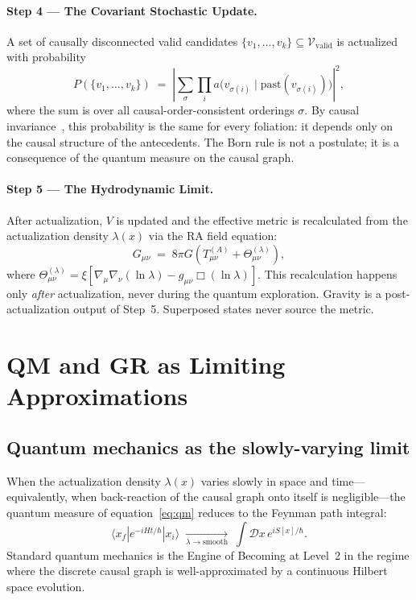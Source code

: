 \documentclass[11pt,twocolumn]{article}
\theoremstyle{plain}
\theoremstyle{remark}
\newcommand{\Vvalid}{\mathcal{V}_{\mathrm{valid}}}
\begin{document}
\paragraph{Step 4 --- The Covariant Stochastic Update.}
A set of causally disconnected valid candidates
$\{v_1,\ldots,v_k\} \subseteq \Vvalid$ is actualized with probability
\begin{equation}
  P(\{v_1,\ldots,v_k\})
  \;=\; \left|\sum_\sigma \prod_i a\bigl(v_{\sigma(i)}
    \mid \mathrm{past}(v_{\sigma(i)})\bigr)\right|^2,
  \label{eq:update}
\end{equation}
where the sum is over all causal-order-consistent orderings $\sigma$.
By causal invariance~\cite{Sorkin1994}, this probability is the same
for every foliation: it depends only on the causal structure of the
antecedents.
The Born rule is not a postulate; it is a consequence of the quantum
measure on the causal graph.

\paragraph{Step 5 --- The Hydrodynamic Limit.}
After actualization, $V$ is updated and the effective metric is
recalculated from the actualization density $\lambda(x)$ via the
RA field equation:
\begin{equation}
  G_{\mu\nu} \;=\; 8\pi G\!\left(T_{\mu\nu}^{(A)}
    + \Theta_{\mu\nu}^{(\lambda)}\right),
  \label{eq:field_eq}
\end{equation}
where $\Theta_{\mu\nu}^{(\lambda)} = \xi[\nabla_\mu\nabla_\nu
(\ln\lambda) - g_{\mu\nu}\Box(\ln\lambda)]$.
This recalculation happens only \emph{after} actualization, never
during the quantum exploration.
Gravity is a post-actualization output of Step~5.
Superposed states never source the metric.

\section{QM and GR as Limiting Approximations}
\label{sec:limits}

\subsection{Quantum mechanics as the slowly-varying limit}

When the actualization density $\lambda(x)$ varies slowly in space
and time---equivalently, when back-reaction of the causal graph onto
itself is negligible---the quantum measure of equation~\eqref{eq:qm}
reduces to the Feynman path integral:
\begin{equation}
  \langle x_f | e^{-iHt/\hbar} | x_i \rangle
  \;\underset{\lambda\to\mathrm{smooth}}{\longrightarrow}\;
  \int \mathcal{D}x\, e^{iS[x]/\hbar}.
  \label{eq:qm_limit}
\end{equation}
Standard quantum mechanics is the Engine of Becoming at Level~2
in the regime where the discrete causal graph is well-approximated
by a continuous Hilbert space evolution.
\end{document}
